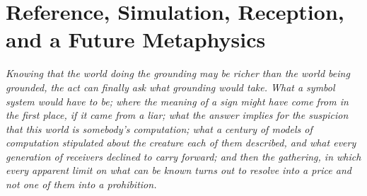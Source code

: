\documentclass[12pt,openright,twoside]{book}
\theoremstyle{remark}
\theoremstyle{plain}
\theoremstyle{remark}
\theoremstyle{plain}
\theoremstyle{plain}
\begin{document}
\bigskip


\part{Reference, Simulation, Reception, and a Future Metaphysics}
\label{part:reference}

\vspace{1em}
\begin{mdframed}[backgroundcolor=remarkgray, linecolor=gray!60,
                 linewidth=1pt, topline=false, rightline=false,
                 bottomline=false]
\small\itshape
Knowing that the world doing the grounding may be richer than the world
being grounded, the act can finally ask what grounding would take.
What a symbol system would have to be; where the meaning of a sign might
have come from in the first place, if it came from a liar; what the answer
implies for the suspicion that this world is somebody's computation; what a
century of
models of computation stipulated about the creature each of them
described, and what every generation of receivers declined to carry
forward; and then the gathering, in which every apparent limit on what
can be known turns out to resolve into a price and not one of them into
a prohibition.
\end{mdframed}

\bigskip

\end{document}
